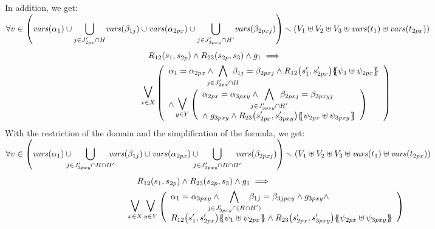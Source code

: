 \documentclass[runningheads]{llncs}
\begin{document}
\begin{enumerate}
In addition, we get: \\
$\displaystyle {\forall v \in {\left(\mathit{vars}{\left(\alpha_{1}\right)}  \cup \bigcup_{j \in J'_{2px} \cap H} \!\mathit{vars}{\left(\beta_{1j}\right)}  \cup \mathit{vars}{\left(\alpha_{2px}\right)}  \cup \bigcup_{j \in J'_{3pxy} \cap H'} \!\mathit{vars}{\left(\beta_{2pxj}\right)}\right)} } \smallsetminus \\ {\left(V_1 \uplus V_2 \uplus V_3 \uplus \mathit{vars}{\left(t_1\right)}\uplus \mathit{vars}{\left(t_{2px}\right)}\right)}  
$
\begin{align*}
R_{12}\mpar{s_1, s_{2p}} \wedge R_{23}\mpar{s_{2p},s_3} \wedge g_1 \implies \hspace{4.5cm}\\\operatorname*{\bigsymb{\bigvee}}_{x \in X} \mpar{\everymath{\displaystyle}
\begin{array}{l}
			\alpha_1 = \alpha_{2px} \wedge \bigwedge_\subbox{j \in J'_{2px} \cap H} \beta_{1j} = \beta_{2pxj}  \wedge R_{12}\mpar{s'_1, s'_{2px}}\psubst{\psi_1 \uplus \psi_{2px}} \\ 
\land
		\operatorname*{\bigsymb{\bigvee}}_{y \in Y} \mpar{\everymath{\displaystyle}
\begin{array}{l}
			 \alpha_{2px}=\alpha_{3pxy} \wedge \bigwedge_\subbox{j \in J'_{3pxy} \cap H'} \beta_{2pxj}=\beta_{3pxyj} \\
			\nwedge g_{3pxy} \wedge R_{23}\mpar{s'_{2px}, s'_{3pxy}}\psubst{\psi_{2px} \uplus \psi_{3pxy}}
		\end{array}}	
		\end{array}} 
\end{align*}		
With the restriction of the domain and the simplification of the formula, we get:\\
$\displaystyle {\forall v \in \mpar{\fvars{\alpha_{1}}  \cup\!\!\! \!\!\bigcup_{j \in J'_{3pxy} \cap H \cap H'} \!\!\!\!\!\fvars{\beta_{1j}}  \cup \fvars{\alpha_{2px}}  \cup\!\!\! \!\!\bigcup_{j \in J'_{3pxy} \cap H\cap H'} \!\!\!\!\!\fvars{\beta_{2pxj}}} } \setminus \\ \mpar{V_1 \uplus V_2 \uplus V_3 \uplus \fvars{t_1}\uplus \fvars{t_{2px}}}  
$
\begin{align*}
R_{12}\mpar{s_1, s_{2p}} \wedge R_{23}\mpar{s_{2p},s_3} \wedge g_1 \implies 
\hspace{5.5cm}\\
\operatorname*{\bigsymb{\bigvee}}_{x \in X} 
\operatorname*{\bigsymb{\bigvee}}_{y \in Y}
\mpar{\everymath{\displaystyle}
\begin{array}{l}
\alpha_1=\alpha_{3pxy}\wedge \bigwedge_\subbox{j \in J'_{3pxy} \cap (H\cap H')} \beta_{1j}=\beta_{3jpxy} \wedge g_{3pxy}\wedge \\
R_{12}\mpar{s'_1, s'_{2px}}\psubst{\psi_1 \uplus \psi_{2px}} \wedge R_{23}\mpar{s'_{2px}, s'_{3pxy}}\psubst{\psi_{2px} \uplus \psi_{3pxy}}
\end{array}}
\end{align*}	


\end{enumerate}
\end{document}
